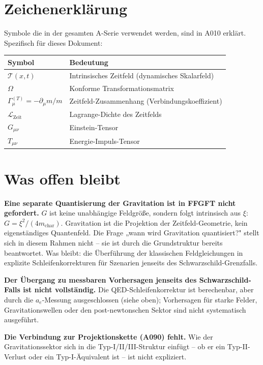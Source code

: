 \section{Zeichenerklärung}

Symbole die in der gesamten A-Serie verwendet werden, sind in A010 erklärt.
Spezifisch für dieses Dokument:

\begin{center}
\renewcommand{\arraystretch}{1.3}
{\small\begin{tabular}{lp{9cm}}
\toprule
Symbol & Bedeutung \\
\midrule
$\mathcal{T}(x,t)$ & Intrinsisches Zeitfeld (dynamisches Skalarfeld) \\
$\Omega$ & Konforme Transformationsmatrix \\
$\Gamma_\mu^{(T)}=-\partial_\mu m/m$ & Zeitfeld-Zusammenhang (Verbindungskoeffizient) \\
$\mathcal{L}_\text{Zeit}$ & Lagrange-Dichte des Zeitfelds \\
$G_{\mu\nu}$ & Einstein-Tensor \\
$T_{\mu\nu}$ & Energie-Impuls-Tensor \\
\bottomrule
\end{tabular}}
\renewcommand{\arraystretch}{1.0}
\end{center}

\section{Was offen bleibt}

\textbf{Eine separate Quantisierung der Gravitation ist in FFGFT nicht
gefordert.} $G$ ist keine unabhängige Feldgröße, sondern folgt intrinsisch
aus $\xi$: $G=\xi^2/(4m_\text{char})$. Gravitation ist die Projektion der
Zeitfeld-Geometrie, kein eigenständiges Quantenfeld. Die Frage
„wann wird Gravitation quantisiert?" stellt sich in diesem Rahmen nicht --
sie ist durch die Grundstruktur bereits beantwortet. Was bleibt: die
Überführung der klassischen Feldgleichungen in explizite Schleifenkorrekturen
für Szenarien jenseits des Schwarzschild-Grenzfalls.

\textbf{Der Übergang zu messbaren Vorhersagen jenseits des Schwarzschild-Falls
ist nicht vollständig.} Die QED-Schleifenkorrektur ist berechenbar, aber durch die $a_e$-Messung ausgeschlossen (siehe oben); Vorhersagen
für starke Felder, Gravitationswellen oder den post-newtonschen Sektor sind nicht
systematisch ausgeführt.

\textbf{Die Verbindung zur Projektionskette (A090) fehlt.} Wie der
Gravitationssektor sich in die Typ-I/II/III-Struktur einfügt -- ob er ein
Typ-II-Verlust oder ein Typ-I-Äquivalent ist -- ist nicht expliziert.

